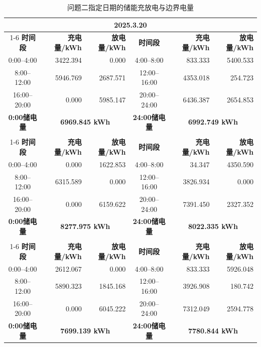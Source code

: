 \begin{table}[H]
\centering\small
\caption{问题二指定日期的储能充放电与边界电量}\label{tab:q2-specified-storage}
\renewcommand{\arraystretch}{0.72}
\begin{tabular*}{\textwidth}{@{\extracolsep{\fill}}crrcrr@{}}
\toprule
\multicolumn{6}{c}{\textbf{2025.3.20}} \\
\cmidrule(lr){1-6}
\textbf{时间段} & \textbf{充电量/kWh} & \textbf{放电量/kWh} & \textbf{时间段} & \textbf{充电量/kWh} & \textbf{放电量/kWh} \\
0:00--4:00 & 3422.394 & 0.000 & 4:00--8:00 & 833.333 & 5400.533 \\
8:00--12:00 & 5946.769 & 2687.571 & 12:00--16:00 & 4353.018 & 254.723 \\
16:00--20:00 & 0.000 & 5985.147 & 20:00--24:00 & 6436.387 & 2654.853 \\
\midrule
\textbf{0:00储电量} & \multicolumn{2}{c}{\textbf{6969.845 kWh}} & \textbf{24:00储电量} & \multicolumn{2}{c}{\textbf{6992.749 kWh}} \\
\addlinespace[4pt]
\multicolumn{6}{c}{\textbf{2025.6.21}} \\
\cmidrule(lr){1-6}
\textbf{时间段} & \textbf{充电量/kWh} & \textbf{放电量/kWh} & \textbf{时间段} & \textbf{充电量/kWh} & \textbf{放电量/kWh} \\
0:00--4:00 & 0.000 & 1622.853 & 4:00--8:00 & 34.347 & 4350.590 \\
8:00--12:00 & 6315.589 & 0.000 & 12:00--16:00 & 3826.934 & 0.000 \\
16:00--20:00 & 0.000 & 6159.622 & 20:00--24:00 & 7391.450 & 2327.352 \\
\midrule
\textbf{0:00储电量} & \multicolumn{2}{c}{\textbf{8277.975 kWh}} & \textbf{24:00储电量} & \multicolumn{2}{c}{\textbf{8022.335 kWh}} \\
\addlinespace[4pt]
\multicolumn{6}{c}{\textbf{2025.9.23}} \\
\cmidrule(lr){1-6}
\textbf{时间段} & \textbf{充电量/kWh} & \textbf{放电量/kWh} & \textbf{时间段} & \textbf{充电量/kWh} & \textbf{放电量/kWh} \\
0:00--4:00 & 2612.067 & 0.000 & 4:00--8:00 & 833.333 & 5926.048 \\
8:00--12:00 & 5890.323 & 1845.168 & 12:00--16:00 & 3926.908 & 180.742 \\
16:00--20:00 & 0.000 & 6045.222 & 20:00--24:00 & 7312.049 & 2594.778 \\
\midrule
\textbf{0:00储电量} & \multicolumn{2}{c}{\textbf{7699.139 kWh}} & \textbf{24:00储电量} & \multicolumn{2}{c}{\textbf{7780.844 kWh}} \\

\end{tabular*}
\end{table}
